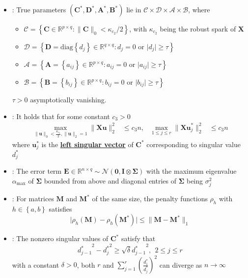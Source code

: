 \documentclass[twoside]{article}
\begin{document}
\begin{itemize}
    \item {}: True parameters $(\mathbf{C}^*,\mathbf{D}^*,\mathbf{A}^*,\mathbf{B}^*)$ lie in $\mathcal{C}\times \mathcal{D}\times \mathcal{A}\times \mathcal{B}$, where 
    \begin{itemize}
        \item $\mathcal{C} = \left\{ \mathbf{C}\in \mathbb{R}^{p\times q}: \lVert \mathbf{C} \rVert _0<\kappa_{c_2}/2 \right\}$, with $\kappa_{c_2}$ being the robust spark of $\mathbf{X}$
        \item $\mathcal{D} = \left\{ \mathbf{D} = \mathrm{diag}\left\{d_j\right\}\in \mathbb{R}^{q\times q}: d_j=0 \text{ or }\lvert d_j \rvert \geq \tau \right\}$
        \item $\mathcal{A} = \left\{ \mathbf{A}=\left\{a_{ij}\right\}\in\mathbb{R}^{p\times q}:a_{ij}=0\text{ or }\lvert a_{ij} \rvert \geq \tau  \right\}$
        \item $\mathcal{B} = \left\{ \mathbf{B}=\left\{b_{ij}\right\}\in\mathbb{R}^{p\times q}:b_{ij}=0\text{ or }\lvert b_{ij} \rvert \geq \tau  \right\}$
    \end{itemize}
    $\tau >0$ asymptotically vanishing.
    \item {}: It holds that for some constant $c_3 >0$
    \begin{align*}
        \max_{\lVert \mathbf{u} \rVert _0 <\frac{\kappa_{c_2}}{2}, \lVert \mathbf{u}\rVert _2=1}\lVert \mathbf{Xu}\rVert ^2_2 &\leq c_3 n, & \max_{1\leq j\leq r}\lVert \mathbf{Xu}^*_j\rVert ^2_2 &\leq c_3 n
    \end{align*}
    where $\mathbf{u}^*_j$ is the \textbf{\underline{left singular vector}} of $\mathbf{C}^*$ corresponding to singular value $d^*_j$
    \item {}: The error term $\mathbf{E}\in\mathbb{R}^{n\times q}\sim \mathcal{N}(\mathbf{0},\mathbf{I}\otimes \boldsymbol{\Sigma} )$ with the maximum eigenvalue $\alpha_{\max}$ of $\boldsymbol{\Sigma}$ bounded from above and diagonal entries of $\boldsymbol{\Sigma}$ being $\sigma^2_j$ 
    \item {}: For matrices $\mathbf{M}$ and $\mathbf{M}^*$ of the same size, the penalty functions $\rho_h$ with $h\in \left\{a,b\right\}$ satisfies $$ \lvert \rho_h(\mathbf{M})-\rho_h(\mathbf{M}^*)\rvert \leq \lVert\mathbf{M}-\mathbf{M}^* \rVert _1 $$
    \item {}: The nonzero singular values of $\mathbf{C}^*$ satisfy that $$ {d^*_{j-1}}^2-{d^*_{j}}^2\geq \sqrt{\delta}{d^*_{j-1}}^2,\ \ 2\leq j\leq r $$ with a constant $\delta >0$, both $r$ and $\sum^r_{j=1}\left( \frac{d^*_1}{d^*_j}\right)^2$ can diverge as $n\rightarrow \infty$
\end{itemize}
\end{document}
